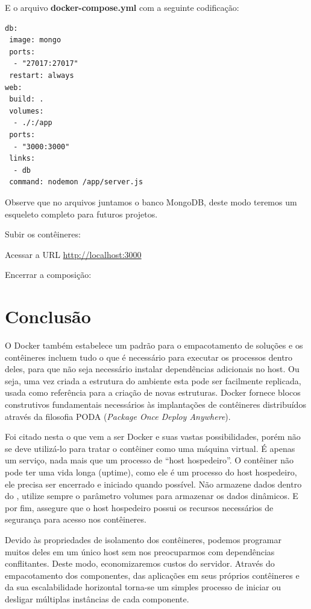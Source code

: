 \documentclass[a4paper,11pt]{article}
\begin{document}
E o arquivo \textbf{docker-compose.yml} com a seguinte codificação:
\begin{lstlisting}[]
db:
 image: mongo
 ports:
  - "27017:27017"
 restart: always
web:
 build: .
 volumes:
  - ./:/app
 ports:
  - "3000:3000"
 links:
  - db
 command: nodemon /app/server.js
\end{lstlisting}

Observe que no arquivos juntamos o banco MongoDB, deste modo teremos um esqueleto completo para futuros projetos. 

Subir os contêineres: \\

Acessar a URL \url{http://localhost:3000}

Encerrar a composição: \\

\section{Conclusão}
O Docker também estabelece um padrão para o empacotamento de soluções e os contêineres incluem tudo o que é necessário para executar os processos dentro deles, para que não seja necessário instalar dependências adicionais no host. Ou seja, uma vez criada a estrutura do ambiente esta pode ser facilmente replicada, usada como referência para a criação de novas estruturas. Docker fornece blocos construtivos fundamentais necessários às implantações de contêineres distribuídos através da filosofia PODA (\textit{Package Once Deploy Anywhere}).

Foi citado nesta o que vem a ser Docker e suas vastas possibilidades, porém não se deve utilizá-lo para tratar o contêiner como uma máquina virtual. É apenas um serviço, nada mais que um processo de ``host hospedeiro''. O contêiner não pode ter uma vida longa (uptime), como ele é um processo do host hospedeiro, ele precisa ser encerrado e iniciado quando possível. Não armazene dados dentro do , utilize sempre o parâmetro volumes para armazenar os dados dinâmicos. E por fim, assegure que o host hospedeiro possui os recursos necessários de segurança para acesso nos contêineres.

Devido às propriedades de isolamento dos contêineres, podemos programar muitos deles em um único host sem nos preocuparmos com dependências conflitantes. Deste modo, economizaremos custos do servidor. Através do empacotamento dos componentes, das aplicações em seus próprios contêineres e da sua escalabilidade horizontal torna-se um simples processo de iniciar ou desligar múltiplas instâncias de cada componente. 
\end{document}
